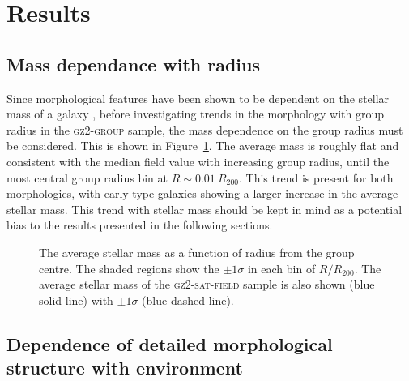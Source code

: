 \section{Results}\label{sec:results}

\subsection{Mass dependance with radius}

Since morphological features have been shown to be dependent on the stellar mass of a galaxy \citep[e.g. the increase in the bar fraction with stellar mass][]{skibba12}, before investigating trends in the morphology with group radius in the \textsc{gz2-group} sample, the mass dependence on the group radius must be considered. This is shown in Figure~\ref{fig:massdep}. The average mass is roughly flat and consistent with the median field value with increasing group radius, until the most central group radius bin at $R \sim 0.01~R_{200}$. This trend is present for both morphologies, with early-type galaxies showing a larger increase in the average stellar mass. This trend with stellar mass should be kept in mind as a potential bias to the results presented in the following sections. 

\begin{figure}
\caption[Average mass with group radius in the GZ2-GROUP sample]{The average stellar mass as a function of radius from the group centre. The shaded regions show the $\pm1\sigma$ in each bin of $R/R_{200}$. The average stellar mass of the \textsc{gz2-sat-field} sample is also shown (blue solid line) with $\pm1\sigma$ (blue dashed line).}
\label{fig:massdep}
\end{figure}

\subsection{Dependence of detailed morphological structure with environment}\label{sec:resmorph}

